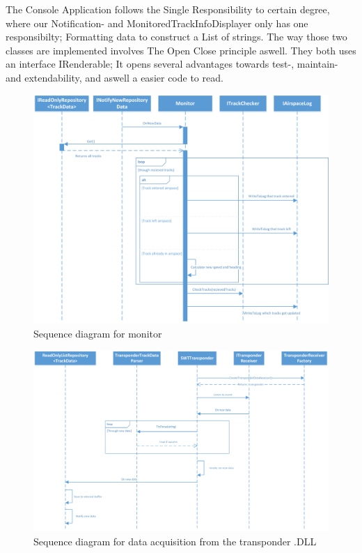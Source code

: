 The Console Application follows the Single Responsibility to certain degree, where our Notification- and MonitoredTrackInfoDisplayer only has one responsibilty; Formatting data to construct a List of strings. The way those two classes are implemented involves The Open Close principle aswell. They both uses an interface IRenderable; It opens several advantages towards test-, maintain- and extendability, and aswell a easier code to read. 
\begin{figure}
	\centering
	\includegraphics[width=1.0\linewidth]{Images/MonitorSeq}
	\caption{Sequence diagram for monitor}
	\label{fig:MonitorSeq}
\end{figure}

\begin{figure}
	\centering
	\includegraphics[width=1.0\linewidth]{Images/SWTTransponder}
	\caption{Sequence diagram for data acquisition from the transponder .DLL}
	\label{fig:SWTTransponderSeq}
\end{figure}

